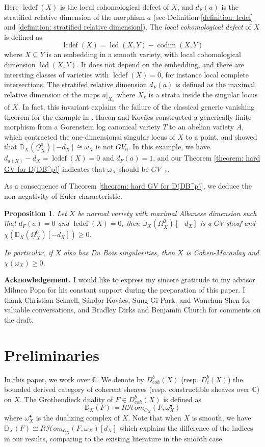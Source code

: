 \documentclass[11pt]{amsart}
\theoremstyle{definition}
\theoremstyle{plain}
\renewcommand{\H}{\mathcal H}
\renewcommand{\O}{\mathcal O}
\newcommand{\CC}{\mathbb C}
\newcommand{\DD}{\mathbb D}
\newcommand{\sHom}{\H om} %
\newcommand{\DB}{\underline{\Omega}} %
\DeclareMathOperator{\lcd}{lcd}
\DeclareMathOperator{\codim}{codim}
\DeclareMathOperator{\lcdef}{lcdef}
\newcommand{\Kovacs}{Kov\'acs}
\newcounter{intro}
\newtheorem{intro-proposition}[intro]{Proposition}
\begin{document}
Here $\lcdef(X)$ is the local cohomological defect of $X$, and $d_F(a)$ is the stratified relative dimension of the morphism $a$ (see Definition \ref{definition: lcdef} and \ref{definition: stratified relative dimension}). The \textit{local cohomological defect} of $X$ is defined as 
\[\lcdef(X) = \lcd(X,Y) - \codim(X,Y)\]
where $X\subseteq Y$ is an embedding in a smooth variety, with local cohomological dimension $\lcd(X,Y)$. It does not depend on the embedding, and there are intersting classes of varieties with $\lcdef(X) = 0$, for instance local complete intersections. The stratifed relative dimension $d_F(a)$ is defined as the maximal relative dimension of the maps $a|_{X_s}$ where $X_s$ is a strata inside the singular locus of $X$. In fact, this invariant explains the failure of the classical generic vanishing theorem for the example in \cite{Hacon-counter_eg_for_GV}. Hacon and \Kovacs{} constructed a generically finite morphism from a Gorenstein log canonical variety $T$ to an abelian variety $A$, which contracted the one-dimensional singular locus of $X$ to a point, and showed that $\DD_X(\DB^0_X)[-d_X] \cong \omega_X$ is not $GV_0$. In this example, we have $d_{a(X)}-d_X = \lcdef(X) = 0$ and $d_F(a) = 1$, and our Theorem \ref{theorem: hard GV for D(DB^p)} indicates that $\omega_X$ should be $GV_{-1}$.

As a consequence of Theorem \ref{theorem: hard GV for D(DB^p)}, we deduce the non-negativity of Euler characteristic.

\begin{intro-proposition} \label{proposition: nonnegativity_Euler_characteristic}
    Let $X$ be normal variety with maximal Albanese dimension such that $d_F(a) = 0$ and $\lcdef(X)=0$, then $\DD_X(\DB_X^0)[-d_X]$ is a $GV$-sheaf and $\chi(\DD_X(\DB_X^0)[-d_X])\ge 0$. 
    
    In particular, if $X$ also has Du Bois singularities, then $X$ is Cohen-Macaulay and $\chi(\omega_X)\ge 0$. 
\end{intro-proposition}
    

\medskip
\noindent \textbf{Acknowledgement.} I would like to express my sincere gratitude to my advisor \\
Mihnea Popa for his constant support during the preparation
of this paper. I thank Christian Schnell, S\' andor  \Kovacs{}, Sung Gi Park, and Wanchun Shen for valuable conversations, and Bradley Dirks and Benjamin Church for comments on the draft. 



\section{Preliminaries}
In this paper, we work over $\CC$. We denote by $D_{coh}^b(X)$ (resp. $D^b_c(X)$) the bounded derived category of coherent sheaves (resp. constructible sheaves over $\CC$) on $X$. The Grothendieck duality of $F\in D_{coh}^b(X)$ is defined as
\[\DD_X(F) \coloneqq R\sHom_{\O_X}(F,\omega_X^\bullet)\]
where $\omega_X^\bullet$ is the dualizing complex of $X$. Note that when $X$ is smooth, we have $\DD_X(F) \cong R\sHom_{\O_X}(F, \omega_X)[d_X]$ which explains the difference of the indices in our results, comparing to the existing literature in the smooth case.
\end{document}
